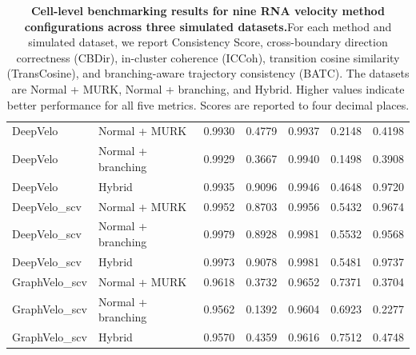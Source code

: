 \begin{table}[ht]
{\begin{tabular}{llrrrrr}
DeepVelo & Normal + MURK & 0.9930 & 0.4779 & 0.9937 & 0.2148 & 0.4198 \\
DeepVelo & Normal + branching & 0.9929 & 0.3667 & 0.9940 & 0.1498 & 0.3908 \\
DeepVelo & Hybrid & 0.9935 & 0.9096 & 0.9946 & 0.4648 & 0.9720 \\
\midrule
DeepVelo\_scv & Normal + MURK & 0.9952 & 0.8703 & 0.9956 & 0.5432 & 0.9674 \\
DeepVelo\_scv & Normal + branching & 0.9979 & 0.8928 & 0.9981 & 0.5532 & 0.9568 \\
DeepVelo\_scv & Hybrid & 0.9973 & 0.9078 & 0.9981 & 0.5481 & 0.9737 \\
\midrule
GraphVelo\_scv & Normal + MURK & 0.9618 & 0.3732 & 0.9652 & 0.7371 & 0.3704 \\
GraphVelo\_scv & Normal + branching & 0.9562 & 0.1392 & 0.9604 & 0.6923 & 0.2277 \\
GraphVelo\_scv & Hybrid & 0.9570 & 0.4359 & 0.9616 & 0.7512 & 0.4748 \\
\bottomrule
\end{tabular}
    }
    \caption{\textbf{\normalsize Cell-level benchmarking results for nine RNA velocity method configurations across three simulated datasets.}\label{tab:suppSimulationCellMetrics}
    \footnotesize
    \normalfont
    For each method and simulated dataset, we report Consistency Score, cross-boundary direction correctness (CBDir), in-cluster coherence (ICCoh), transition cosine similarity (TransCosine), and branching-aware trajectory consistency (BATC). The datasets are Normal + MURK, Normal + branching, and Hybrid. Higher values indicate better performance for all five metrics. Scores are reported to four decimal places.
    }
\end{table}
